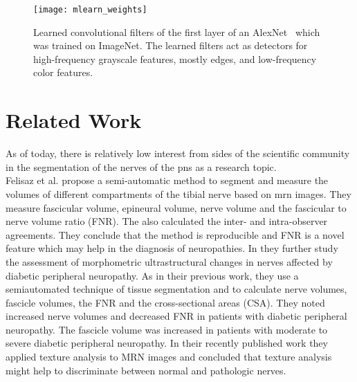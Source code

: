 \begin{figure}[htbp]
    \centering
	\texttt{[image: mlearn\_weights]}
    \caption[Learned Weights of trained AlexNet]{Learned convolutional filters of the first layer of an AlexNet~\cite{Krizhevsky2012ImageNetNetworks} which was trained on ImageNet. The learned filters act as detectors for high-frequency grayscale features, mostly edges, and low-frequency color features.}
    \label{fig:mlearn_weights}
\end{figure}

\section{Related Work} %
As of today, there is relatively low interest from sides of the scientific community in the segmentation of the nerves of the \gls{pns} as a research topic.\\
Felisaz et al.\cite{Felisaz2016NerveMicro-neurography} propose a semi-automatic method to segment and measure the volumes of different compartments of the tibial nerve based on \gls{mrn} images. They measure fascicular volume, epineural volume, nerve volume and the fascicular to nerve volume ratio (FNR). The also calculated the inter- and intra-observer agreements. They conclude that the method is reproducible and FNR is a novel feature which may help in the diagnosis of neuropathies.
In \cite{Felisaz2017MRNeuropathy.} they further study the assessment of morphometric ultrastructural changes in nerves affected by diabetic peripheral neuropathy. As in their previous work, they use a semiautomated technique of tissue segmentation and to calculate nerve volumes, fascicle volumes, the FNR and the cross-sectional areas (CSA). They noted increased nerve volumes and decreased FNR in patients with diabetic peripheral neuropathy. The fascicle volume was increased in patients with moderate to severe diabetic peripheral neuropathy.
In their recently published work \cite{FelisazTextureNeuropathy} they applied texture analysis to MRN images and concluded that texture analysis might help to discriminate between normal and pathologic nerves.\\
